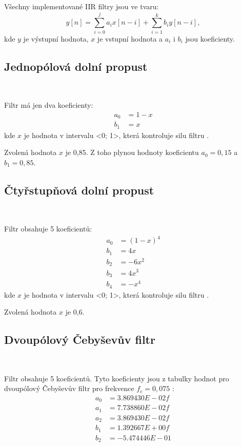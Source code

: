 Všechny implementované IIR filtry jsou ve tvaru:
\begin{equation}
y[n] = \sum_{i = 0}^{j}a_{i}x[n - i] + \sum_{i = 1}^{k}b_{i}y[n - i],
\end{equation}
kde $y$ je výstupní hodnota, $x$ je vstupní hodnota a $a_i$ i $b_i$ jsou
koeficienty.

\subsection{Jednopólová dolní propust}\

Filtr má jen dva koeficienty:
\begin{align}
a_0 &= 1 - x \\
b_1 &= x
\end{align}
kde $x$ je hodnota v intervalu <0; 1>, která kontroluje silu filtru \cite{Filters}.

Zvolená hodnota $x$ je 0,85. Z toho plynou hodnoty koeficientu $a_0 = 0,15$ a $b_1 =
0,85$.

\subsection{Čtyřstupňová dolní propust}\

Filtr obsahuje 5 koeficientů:
\begin{align}
a_0 &= (1 - x)^4 \\
b_1 &= 4x \\
b_2 &= -6x^2 \\
b_3 &= 4x^3 \\
b_4 &= -x^4
\end{align}
kde $x$ je hodnota v intervalu <0; 1>, která kontroluje silu filtru \cite{Filters}.

Zvolená hodnota $x$ je 0,6.

\subsection{Dvoupólový Čebyševův filtr}\

Filtr obsahuje 5 koeficientů. Tyto koeficienty jsou z tabulky hodnot pro dvoupólový
Čebyševův filtr pro frekvence $f_c = 0,075$ \cite{Filters}:
\begin{align}
a_0 &= 3.869430E-02f \\
a_1 &= 7.738860E-02f \\
a_2 &= 3.869430E-02f \\
b_1 &= 1.392667E+00f \\
b_2 &= -5.474446E-01 \\
\end{align}

